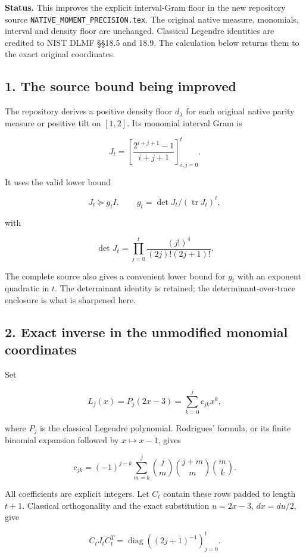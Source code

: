 \textbf{Status.} This improves the explicit interval-Gram floor in the
new repository source \texttt{NATIVE\_MOMENT\_PRECISION.tex}. The
original native measure, monomials, interval and density floor are
unchanged. Classical Legendre identities are credited to NIST DLMF
§§18.5 and 18.9. The calculation below returns them to the exact
original coordinates.

\subsection{1. The source bound being
improved}\label{the-source-bound-being-improved}

The repository derives a positive density floor \(d_\lambda\) for each
original native parity measure or positive tilt on \([1,2]\). Its
monomial interval Gram is

\[
 J_t=\left[\frac{2^{i+j+1}-1}{i+j+1}\right]_{i,j=0}^t.
\]

It uses the valid lower bound

\[
 J_t\succeq g_tI,\qquad g_t=\det J_t/(\operatorname{tr}J_t)^t,
\]

with

\[
 \det J_t=\prod_{j=0}^t\frac{(j!)^4}{(2j)!(2j+1)!}.
\]

The complete source also gives a convenient lower bound for \(g_t\) with
an exponent quadratic in \(t\). The determinant identity is retained;
the determinant-over-trace enclosure is what is sharpened here.

\subsection{2. Exact inverse in the unmodified monomial
coordinates}\label{exact-inverse-in-the-unmodified-monomial-coordinates}

Set

\[
 L_j(x)=P_j(2x-3)=\sum_{k=0}^j c_{jk}x^k,
\]

where \(P_j\) is the classical Legendre polynomial. Rodrigues' formula,
or its finite binomial expansion followed by \(x\mapsto x-1\), gives

\[
 \boxed{c_{jk}=(-1)^{j-k}
 \sum_{m=k}^j\binom jm\binom{j+m}{m}\binom mk.}
\]

All coefficients are explicit integers. Let \(C_t\) contain these rows
padded to length \(t+1\). Classical orthogonality and the exact
substitution \(u=2x-3\), \(dx=du/2\), give

\[
 C_t J_t C_t^T=\operatorname{diag}((2j+1)^{-1})_{j=0}^t.
\]


